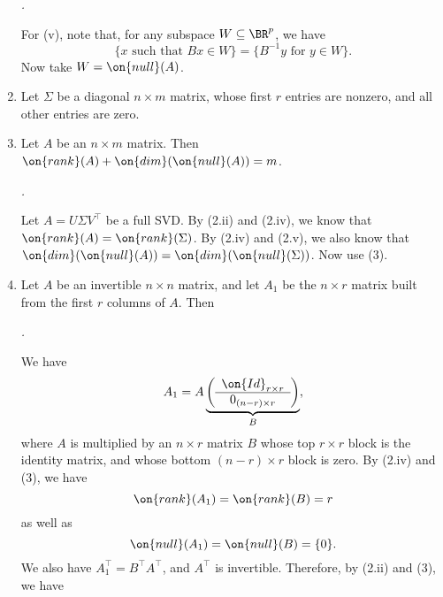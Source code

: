 \documentclass[10pt]{amsart}
\makeatletter
\renewenvironment{proof}[1][\proofname]{\par
	\pushQED{\qed}%
	\normalfont \topsep6\p@\@plus6\p@\relax
	\noindent\emph{#1.} 
	\ignorespaces
}{%
\popQED\endtrivlist\@endpefalse
}
\theoremstyle{mythm}
\theoremstyle{definition}
\theoremstyle{myrmk}
\newenvironment{myproof}{\color{blue}\begin{proof}}{\end{proof}}
\makeatother
\begin{document}
\begin{enumerate}[label=(\arabic*)]
\begin{myproof}
			For (v), note that, for any subspace $W \subseteq \BR^p$, we have 
			\[
				\{x \text{ such that } Bx \in W\} = \{B^{-1}y \text{ for } y \in W\}. 
			\]
			Now take $W = \on{null}(A)$. 
		\end{myproof}
		\item Let $\Sigma$ be a diagonal $n \times m$ matrix, whose first $r$ entries are nonzero, and all other entries are zero. 
		\item Let $A$ be an $n \times m$ matrix. Then $\on{rank}(A) + \on{dim}(\on{null}(A)) = m$. 
		\begin{myproof}
			Let $A = U \Sigma V^\top$ be a full SVD. By (2.ii) and (2.iv), we know that $\on{rank}(A) = \on{rank}(\Sigma)$. By (2.iv) and (2.v), we also know that $\on{dim}(\on{null}(A)) = \on{dim}(\on{null}(\Sigma))$. Now use (3). 
		\end{myproof}
		\item Let $A$ be an invertible $n \times n$ matrix, and let $A_1$ be the $n \times r$ matrix built from the first $r$ columns of $A$. Then 
		\begin{myproof}
			We have 
			\[
				A_1 = A \underbrace{\left( \begin{array}{c} \on{Id}_{r \times r} \\ \hline 0_{(n-r) \times r}\end{array} \right)}_B, 
			\]
			where $A$ is multiplied by an $n \times r$ matrix $B$ whose top $r \times r$ block is the identity matrix, and whose bottom $(n-r) \times r$ block is zero. By (2.iv) and (3), we have 
			\[
				\on{rank}(A_1) = \on{rank}(B) = r
			\]
			as well as  
			\[
				\on{null}(A_1) = \on{null}(B) = \{0\}. 
			\]
			We also have $A_1^\top = B^\top A^\top$, and $A^\top$ is invertible. Therefore, by (2.ii) and (3), we have 

\end{myproof}
\end{enumerate}
\end{document}
